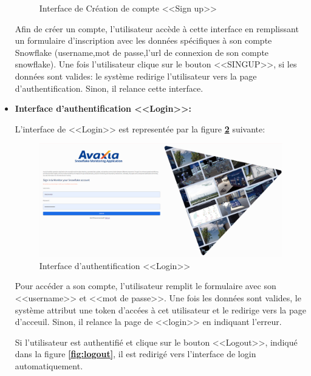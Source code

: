 \begin{itemize}
\begin{figure}[H]
            \caption{Interface de Création de compte <<Sign up>> }
                \label{fig:signup}
            \end{figure}
            \par Afin de créer un compte, l'utilisateur accède à cette interface en remplissant un formulaire d'inscription avec les données spécifiques à son compte Snowflake (username,mot de passe,l'url de connexion de son compte snowflake).
            Une fois l'utilisateur clique sur le bouton <<SINGUP>>, si les données sont valides: le système redirige l'utilisateur vers la page d'authentification. Sinon, il relance cette interface.
            \item \textbf{Interface d'authentification  <<Login>>:}
            \par L'interface de <<Login>> est representée par la figure \textbf{\ref{fig:login}} suivante:
            \begin{figure}[H]
                \centering
                \includegraphics[width =1\linewidth]{img/captures/auth/login.png}
                \caption{Interface d'authentification  <<Login>>}
                    \label{fig:login}
                \end{figure}
                \par Pour accéder a son compte, l'utilisateur remplit le formulaire avec son <<username>> et <<mot de passe>>. Une fois les données sont valides, le système attribut une token d'accées à cet utilisateur et le redirige vers la page d'acceuil. Sinon, il relance la page de <<login>> en indiquant l'erreur.
                \par Si l'utilisateur est authentifié et clique sur le bouton <<Logout>>, indiqué dans la figure \textbf{\ref{fig:logout}}, il est redirigé vers l'interface de login automatiquement.
                \begin{figure}[H]
                    \centering

\end{figure}
\end{itemize}
